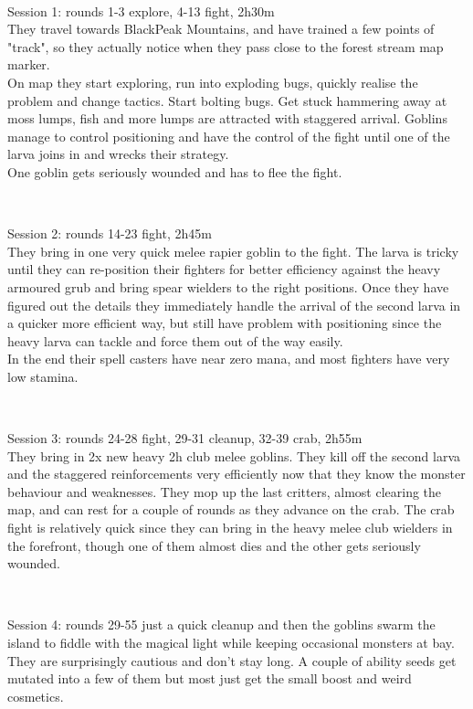 \

Session 1: rounds 1-3 explore, 4-13 fight, 2h30m\\
They travel towards BlackPeak Mountains, and have trained a few points of "track", so they actually notice when they pass close to the forest stream map marker.\\
On map they start exploring, run into exploding bugs, quickly realise the problem and change tactics. Start bolting bugs. Get stuck hammering away at moss lumps, fish and more lumps are attracted with staggered arrival. Goblins manage to control positioning and have the control of the fight until one of the larva joins in and wrecks their strategy.\\
One goblin gets seriously wounded and has to flee the fight.

\

Session 2: rounds 14-23 fight, 2h45m\\
They bring in one very quick melee rapier goblin to the fight. The larva is tricky until they can re-position their fighters for better efficiency against the heavy armoured grub and bring spear wielders to the right positions. Once they have figured out the details they immediately handle the arrival of the second larva in a quicker more efficient way, but still have problem with positioning since the heavy larva can tackle and force them out of the way easily.\\
In the end their spell casters have near zero mana, and most fighters have very low stamina.

\

Session 3: rounds 24-28 fight, 29-31 cleanup, 32-39 crab, 2h55m\\
They bring in 2x new heavy 2h club melee goblins. They kill off the second larva and the staggered reinforcements very efficiently now that they know the monster behaviour and weaknesses. They mop up the last critters, almost clearing the map, and can rest for a couple of rounds as they advance on the crab. The crab fight is relatively quick since they can bring in the heavy melee club wielders in the forefront, though one of them almost dies and the other gets seriously wounded.

\

Session 4: rounds 29-55 just a quick cleanup and then the goblins swarm the island to fiddle with the magical light while keeping occasional monsters at bay. They are surprisingly cautious and don't stay long. A couple of ability seeds get mutated into a few of them but most just get the small boost and weird cosmetics.










